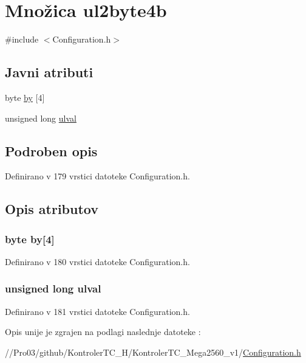 \hypertarget{unionul2byte4b}{}\section{ Množica ul2byte4b}
\label{unionul2byte4b}


{\ttfamily \#include $<$Configuration.\+h$>$}

\subsection*{Javni atributi}
\begin{DoxyCompactItemize}
\item 
byte \hyperlink{unionul2byte4b_a3ac70c71a12988f6a0733cd4a585a5e8}{by} \mbox{[}4\mbox{]}
\item 
unsigned long \hyperlink{unionul2byte4b_ad937a6850aeb34300671e2daeb4f1b06}{ulval}
\end{DoxyCompactItemize}


\subsection{Podroben opis}


Definirano v 179 vrstici datoteke Configuration.\+h.



\subsection{Opis atributov}
\hypertarget{unionul2byte4b_a3ac70c71a12988f6a0733cd4a585a5e8}{}
\subsubsection[{by}]{\setlength{\rightskip}{0pt plus 5cm}byte by\mbox{[}4\mbox{]}}\label{unionul2byte4b_a3ac70c71a12988f6a0733cd4a585a5e8}


Definirano v 180 vrstici datoteke Configuration.\+h.

\hypertarget{unionul2byte4b_ad937a6850aeb34300671e2daeb4f1b06}{}
\subsubsection[{ulval}]{\setlength{\rightskip}{0pt plus 5cm}unsigned long ulval}\label{unionul2byte4b_ad937a6850aeb34300671e2daeb4f1b06}


Definirano v 181 vrstici datoteke Configuration.\+h.



Opis unije je zgrajen na podlagi naslednje datoteke \+:\begin{DoxyCompactItemize}
\item 
//\+Pro03/github/\+Kontroler\+T\+C\+\_\+\+H/\+Kontroler\+T\+C\+\_\+\+Mega2560\+\_\+v1/\hyperlink{_configuration_8h}{Configuration.\+h}\end{DoxyCompactItemize}
